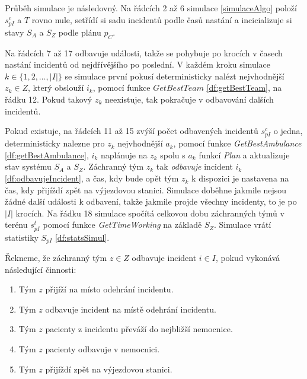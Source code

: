 \vspace*{10px}

Průběh simulace je následovný. 
Na řádcích 2 až 6 simulace \ref{simulaceAlgo} položí $s^{c}_{pI}$ a $T$ rovno nule, setřídí si sadu incidentů podle časů nastání
a incicializuje si stavy $S_A$ a $S_Z$ podle plánu $p_C$.

Na řádcích 7 až 17 odbavuje události, takže se pohybuje po krocích v časech nastání incidentů od nejdřívějšího po poslední.
V každém kroku simulace $k \in \{ 1, 2, \dots , |I|\}$ se simulace první pokusí deterministicky nalézt nejvhodnější $z_k \in Z$, který obslouží $i_k$,
pomocí funkce $\textit{GetBestTeam}$ \ref{df:getBestTeam}, na řádku 12.
Pokud takový $z_k$ neexistuje, tak pokračuje v odbavování dalších incidentů.

Pokud existuje, na řádcích 11 až 15 zvýší počet odbavených incidentů $s^c_{pI}$ o jedna,
deterministicky nalezne pro $z_k$ nejvhodnější $a_k$, pomocí funkce \textit{GetBestAmbulance} \ref{df:getBestAmbulance},
$i_k$ naplánuje na $z_k$ spolu s $a_k$ funkcí \textit{Plan} a aktualizuje stav systému $S_A$ a $S_Z$.
Záchranný tým $z_k$ tak \textit{odbavuje} incident $i_k$ \ref{df:odbavujeIncident}, a čas, kdy bude opět tým $z_k$ k dispozici je nastavena na čas, kdy přijíždí zpět na výjezdovou stanici.
Simulace doběhne jakmile nejsou žádné další události k odbavení, takže jakmile projde všechny incidenty, to je po $|I|$ krocích.
Na řádku 18 simulace spočítá celkovou dobu záchranných týmů v terénu $s^t_{pI}$ pomocí funkce \textit{GetTimeWorking} na základě $S_Z$.
Simulace vrátí statistiky $S_{pI}$ \ref{df:statsSimul}.

\begin{definice}\label{df:odbavujeIncident}
  Řekneme, že záchranný tým $z \in Z$ odbavuje incident $i \in I$, pokud vykonává následující činnosti:
  \begin{enumerate}
    \item
      Tým $z$ přijíží na místo odehrání incidentu.

    \item
      Tým $z$ odbavuje incident na místě odehrání incidentu.

    \item
      Tým $z$ pacienty z incidentu převáží do nejbližší nemocnice.

    \item
      Tým $z$ pacienty odbavuje v nemocnici.

    \item
      Tým $z$ přijíždí zpět na výjezdovou stanici.
  \end{enumerate}
\end{definice}

